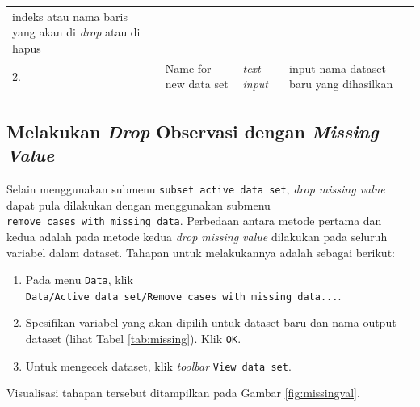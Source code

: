 \documentclass[12pt,]{krantz}
\providecommand{\tightlist}{%
  \setlength{\itemsep}{0pt}\setlength{\parskip}{0pt}}
\begin{document}
\begin{longtable}[]{@{}llll@{}}
\begin{minipage}[t]{0.61\columnwidth}
indeks atau nama baris yang akan di \emph{drop} atau di hapus\strut
\end{minipage}\tabularnewline
\begin{minipage}[t]{0.04\columnwidth}\raggedright
2.\strut
\end{minipage} & \begin{minipage}[t]{0.14\columnwidth}\raggedright
Name for new data set\strut
\end{minipage} & \begin{minipage}[t]{0.09\columnwidth}\raggedright
\emph{text input}\strut
\end{minipage} & \begin{minipage}[t]{0.61\columnwidth}\raggedright
input nama dataset baru yang dihasilkan\strut
\end{minipage}\tabularnewline
\bottomrule
\end{longtable}

\hypertarget{melakukan-drop-observasi-dengan-missing-value}{%
\subsection{\texorpdfstring{Melakukan \emph{Drop} Observasi dengan \emph{Missing Value}}{Melakukan Drop Observasi dengan Missing Value}}\label{melakukan-drop-observasi-dengan-missing-value}}

Selain menggunakan submenu \texttt{subset\ active\ data\ set}, \emph{drop missing value} dapat pula dilakukan dengan menggunakan submenu \texttt{remove\ cases\ with\ missing\ data}. Perbedaan antara metode pertama dan kedua adalah pada metode kedua \emph{drop missing value} dilakukan pada seluruh variabel dalam dataset. Tahapan untuk melakukannya adalah sebagai berikut:

\begin{enumerate}
\def\labelenumi{\arabic{enumi}.}
\tightlist
\item
  Pada menu \texttt{Data}, klik \texttt{Data/Active\ data\ set/Remove\ cases\ with\ missing\ data...}.
\item
  Spesifikan variabel yang akan dipilih untuk dataset baru dan nama output dataset (lihat Tabel \ref{tab:missing}). Klik \texttt{OK}.
\item
  Untuk mengecek dataset, klik \emph{toolbar} \texttt{View\ data\ set}.
\end{enumerate}

Visualisasi tahapan tersebut ditampilkan pada Gambar \ref{fig:missingval}.
\end{document}
